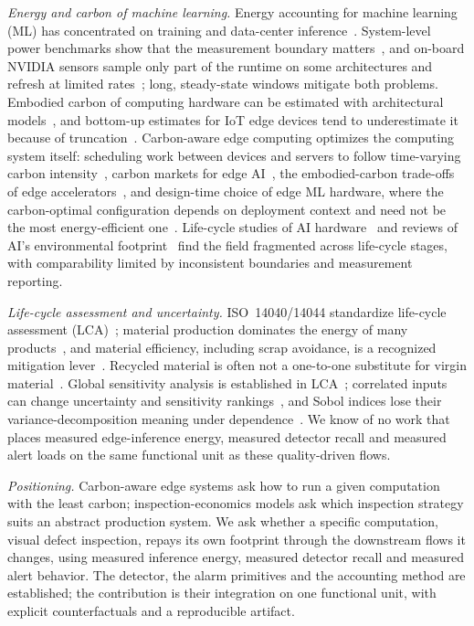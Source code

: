 \emph{Energy and carbon of machine learning.} Energy accounting for machine learning (ML) has concentrated on training and data-center inference~\cite{strubell2020energy,henderson2020towards,desislavov2023trends}. System-level power benchmarks show that the measurement boundary matters~\cite{tschand2025mlperf}, and on-board NVIDIA sensors sample only part of the runtime on some architectures and refresh at limited rates~\cite{yang2024accurate}; long, steady-state windows mitigate both problems. Embodied carbon of computing hardware can be estimated with architectural models~\cite{gupta2022act,halder2025carbon}, and bottom-up estimates for IoT edge devices tend to underestimate it because of truncation~\cite{pirson2021embodied}. Carbon-aware edge computing optimizes the computing system itself: scheduling work between devices and servers to follow time-varying carbon intensity~\cite{son2025greenscale}, carbon markets for edge AI~\cite{ma2023carbon}, the embodied-carbon trade-offs of edge accelerators~\cite{ollivier2023sustainable}, and design-time choice of edge ML hardware, where the carbon-optimal configuration depends on deployment context and need not be the most energy-efficient one~\cite{chen2026greener}. Life-cycle studies of AI hardware~\cite{schneider2025introduction} and reviews of AI's environmental footprint~\cite{lambert2026cradle,devadas2026carbon,rojahn2026green} find the field fragmented across life-cycle stages, with comparability limited by inconsistent boundaries and measurement reporting.

\emph{Life-cycle assessment and uncertainty.} ISO~14040/14044 standardize life-cycle assessment (LCA)~\cite{finkbeiner2006new}; material production dominates the energy of many products~\cite{gutowski2013energy}, and material efficiency, including scrap avoidance, is a recognized mitigation lever~\cite{allwood2011material,ashby2012materials}. Recycled material is often not a one-to-one substitute for virgin material~\cite{sanabria2023substitutability}. Global sensitivity analysis is established in LCA~\cite{groen2017methods,jaxarozen2021variance}; correlated inputs can change uncertainty and sensitivity rankings~\cite{kim2025global}, and Sobol indices lose their variance-decomposition meaning under dependence~\cite{iooss2019shapley}. We know of no work that places measured edge-inference energy, measured detector recall and measured alert loads on the same functional unit as these quality-driven flows.

\emph{Positioning.} Carbon-aware edge systems ask how to run a given computation with the least carbon; inspection-economics models ask which inspection strategy suits an abstract production system. We ask whether a specific computation, visual defect inspection, repays its own footprint through the downstream flows it changes, using measured inference energy, measured detector recall and measured alert behavior. The detector, the alarm primitives and the accounting method are established; the contribution is their integration on one functional unit, with explicit counterfactuals and a reproducible artifact.


